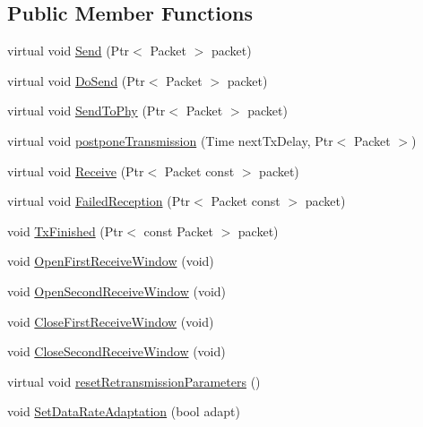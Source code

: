 \subsection*{Public Member Functions}
\begin{DoxyCompactItemize}
\item 
virtual void \hyperlink{classns3_1_1lorawan_1_1EndDeviceLoraMac_a6566cdcccf21b69267215758f36e7ee9}{Send} (Ptr$<$ Packet $>$ packet)
\item 
virtual void \hyperlink{classns3_1_1lorawan_1_1EndDeviceLoraMac_a1e1e4b2c0250f5d37456817f936e5eda}{Do\+Send} (Ptr$<$ Packet $>$ packet)
\item 
virtual void \hyperlink{classns3_1_1lorawan_1_1EndDeviceLoraMac_a4a763f71c529f8557264ea61b7d2b81e}{Send\+To\+Phy} (Ptr$<$ Packet $>$ packet)
\item 
virtual void \hyperlink{classns3_1_1lorawan_1_1EndDeviceLoraMac_a52344bd799bd6c0bc4032b0137f1a1c4}{postpone\+Transmission} (Time next\+Tx\+Delay, Ptr$<$ Packet $>$)
\item 
virtual void \hyperlink{classns3_1_1lorawan_1_1EndDeviceLoraMac_a7bb29a550534c631e2ee7cc3407a2bcd}{Receive} (Ptr$<$ Packet const $>$ packet)
\item 
virtual void \hyperlink{classns3_1_1lorawan_1_1EndDeviceLoraMac_ab1fe806e8a0f5aa3a17fd1c39e831d44}{Failed\+Reception} (Ptr$<$ Packet const $>$ packet)
\item 
void \hyperlink{classns3_1_1lorawan_1_1EndDeviceLoraMac_a939732c613ae14a71c902ade45ee2e40}{Tx\+Finished} (Ptr$<$ const Packet $>$ packet)
\item 
void \hyperlink{classns3_1_1lorawan_1_1EndDeviceLoraMac_a95863dd6763948f579b94ffa6acc6b0c}{Open\+First\+Receive\+Window} (void)
\item 
void \hyperlink{classns3_1_1lorawan_1_1EndDeviceLoraMac_ac7d55666cfe7adc2f159b87543811ba2}{Open\+Second\+Receive\+Window} (void)
\item 
void \hyperlink{classns3_1_1lorawan_1_1EndDeviceLoraMac_ae9ab8ccd648b94b6b9aa7d8c18272274}{Close\+First\+Receive\+Window} (void)
\item 
void \hyperlink{classns3_1_1lorawan_1_1EndDeviceLoraMac_a522179b116be5fe2edd2f4806e00a055}{Close\+Second\+Receive\+Window} (void)
\item 
virtual void \hyperlink{classns3_1_1lorawan_1_1EndDeviceLoraMac_aaa243098bbaf100c7880d2ff9d936ac3}{reset\+Retransmission\+Parameters} ()
\item 
void \hyperlink{classns3_1_1lorawan_1_1EndDeviceLoraMac_a32175f77b6b6386f5092a4800e6c41bb}{Set\+Data\+Rate\+Adaptation} (bool adapt)

\end{DoxyCompactItemize}
